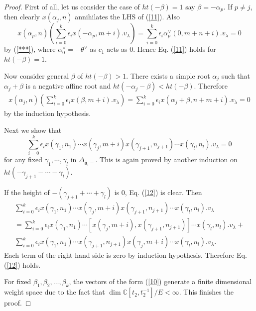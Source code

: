 \documentclass[11pt]{amsproc}
\theoremstyle{definition}
\theoremstyle{remark}
\numberwithin{equation}{section} \errorcontextlines=0
\begin{document}
\begin{proof}
First of all, let us consider the case of $ht(-\beta)=1$ say
$\beta=-\alpha_p$. If $p\neq j$, then clearly $x(\alpha_j, n)$
annihilates the LHS of (\ref{11}). Also
\begin{equation*}
x(\alpha_p,n)(\sum\limits_{i=0}^k\epsilon_i
x(-\alpha_p,m+i).v_{\lambda})
=\sum\limits_{i=0}^k\epsilon_i\alpha_p^{\vee}(0,m+n+i).v_{\lambda}=0
\end{equation*}
by (\ref{***}), where $\alpha_0^{\vee}=-\theta^{\vee}$ as $c_1$ acts
as $0$. Hence Eq. (\ref{11}) holds for $ht(-\beta)=1$.

Now consider general $\beta$ of $ht(-\beta)>1$. There exists a
simple root $\alpha_j$ such that $\alpha_j+\beta$ is a negative
affine root and $ht(-\alpha_j-\beta)<ht(-\beta)$. Therefore
\begin{align*}
x(\alpha_j,n)(\sum\limits_{i=0}^k\epsilon_ix(\beta,m+i).v_{\lambda})
=\sum\limits_{i=0}^k\epsilon_ix(\alpha_{j}+\beta,n+m+i).v_{\lambda}=0
\end{align*}
by the induction hypothesis.

Next we show that
\begin{equation}\label{12}
\sum\limits_{i=0}^k\epsilon_ix(\gamma_1,n_1)\cdots
x(\gamma_j,m+i)x(\gamma_{j+1},n_{j+1})\cdots
x(\gamma_l,n_l).v_{\lambda}=0
\end{equation}
for any fixed $\gamma_1,\cdots,\gamma_l$ in $\Delta_{\hat{\mathfrak g}_1-}$. 
This is again proved by another induction on $ht(-\gamma_{j+1}-\cdots-\gamma_l)$.

If the height of $-(\gamma_{j+1}+\cdots+\gamma_l)$ is 0, Eq.
(\ref{12}) is clear. Then
\begin{equation*}
\begin{split}
\sum\limits_{i=0}^k\epsilon_ix(\gamma_1,n_1)\cdots
x(\gamma_j,m+i)x(\gamma_{j+1},n_{j+1})\cdots x(\gamma_l,n_l).v_{\lambda}\\
=\sum\limits_{i=0}^k\epsilon_{i}x(\gamma_1,n_1)\cdots
[x(\gamma_j,m+i),x(\gamma_{j+1},n_{j+1})]\cdots
x(\gamma_l,n_l).v_{\lambda}+\\
\sum\limits_{i=0}^k\epsilon_ix(\gamma_1,n_1)\cdots
x(\gamma_{j+1},n_{j+1})x(\gamma_j,m+i)\cdots
x(\gamma_l,n_l).v_{\lambda}.
\end{split}
\end{equation*}
Each term of the right hand side is zero by induction hypothesis.
Therefore Eq.(\ref{12}) holds.

For fixed
$\beta_1,\beta_2,\ldots,\beta_k$, the vectors of the form (\ref{10})
generate a finite dimensional weight space due to the fact that
$\dim \mathbb C[t_2, t_2^{-1}]/E <\infty$. This finishes the proof.
\end{proof}
\end{document}
